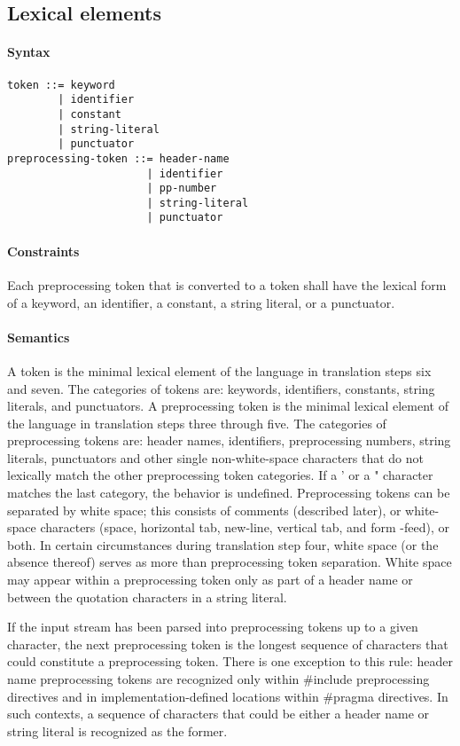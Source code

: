 \documentclass{article}
\begin{document}
\subsection{Lexical elements}
\paragraph*{Syntax}
\begin{lstlisting}[language=bnf]
token ::= keyword    
        | identifier
        | constant   
        | string-literal
        | punctuator
preprocessing-token ::= header-name 
                      | identifier
                      | pp-number   
                      | string-literal
                      | punctuator
\end{lstlisting}
\paragraph*{Constraints}
Each preprocessing token that is converted to a token shall have the lexical form of a 
keyword, an identifier, a constant, a string literal, or a punctuator.

\paragraph*{Semantics}
A token is the minimal lexical element of the language in translation steps six and seven.
The categories of tokens are: keywords, identifiers, constants, string literals, and
punctuators. A preprocessing token is the minimal lexical element of the language in
translation steps three through five. The categories of preprocessing tokens are: header
names, identifiers, preprocessing numbers, string literals, punctuators and other single
non-white-space characters that do not lexically match the other preprocessing token
categories. If a ' or a " character matches the last category, the behavior is undefined.
Preprocessing tokens can be separated by white space; this consists of comments (described
later), or white-space characters (space, horizontal tab, new-line, vertical tab, and form
-feed), or both. In certain circumstances during translation step four, white space (or
the absence thereof) serves as more than preprocessing token separation. White space may 
appear within a preprocessing token only as part of a header name or between the quotation
characters in a string literal.
\linebreak

If the input stream has been parsed into preprocessing tokens up to a given character, the
next preprocessing token is the longest sequence of characters that could constitute a
preprocessing token. There is one exception to this rule: header name preprocessing tokens
are recognized only within \#include preprocessing directives and in implementation-defined
locations within \#pragma directives. In such contexts, a sequence of characters that
could be either a header name or string literal is recognized as the former.
\end{document}
